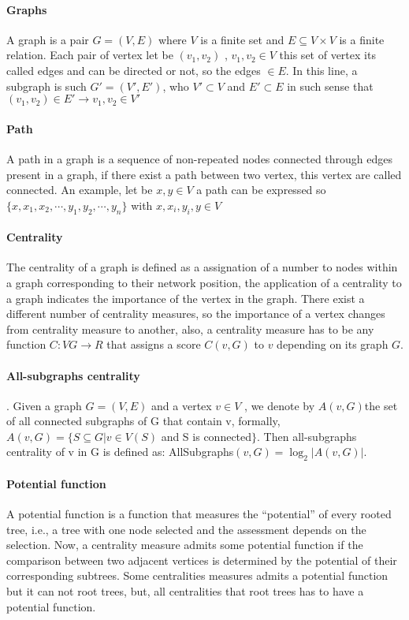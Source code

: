 

\paragraph{Graphs} A graph is a pair $G = (V, E)$ where $V$ is a finite set and $E \subseteq V\times V$ is a finite relation. Each pair of vertex let be $(v_{1},v_{2})$ , $v_{1},v_{2} \in V$ this set of vertex its called edges and can be directed or not, so the edges $\in E$. In this line, a subgraph is such $G'=(V', E')$, who $V' \subset V$ and $E' \subset E$ in such sense that $(v_{1},v_{2}) \in E' \rightarrow v_{1},v_{2} \in V'$

\paragraph{Path} A path in a graph is a sequence of non-repeated nodes connected through edges present in a graph, if there exist a path between two vertex, this vertex are called connected. An example, let be $x,y \in V$ a path can be expressed so $\{x,x_{1},x_{2},\cdots,y_{1},y_{2},\cdots,y_{n} \}$ with $x,x_{i},y_{i},y \in V$


\paragraph{Centrality} The centrality of a graph is defined as a assignation of a number to nodes within a graph corresponding to their network position, the application of a centrality to a graph indicates the importance of the vertex in the graph. There exist a different number of centrality measures, so the importance of a vertex changes from centrality measure to another, also, a centrality measure has to be any function $C : VG \rightarrow R$ that assigns a score $C(v, G)$ to $v$ depending on its graph $G$. 

\paragraph{All-subgraphs centrality} . Given a graph $G = (V, E)$ and a vertex $v \in V$ , we denote by $A(v, G) $the set of all connected subgraphs of G that contain v, formally, $A(v, G) = \{S \subseteq G | v \in V (S)$ and S is connected$\}$. Then all-subgraphs centrality of v in G is defined
as: AllSubgraphs$(v, G) = \log_{2}{|A(v, G)|}$.

\paragraph{Potential function} A potential function is a function that measures the “potential” of every rooted tree, i.e.,
a tree with one node selected and the assessment depends on the selection. Now, a centrality measure admits some potential function if the comparison between two adjacent vertices is determined by the potential of their corresponding subtrees. Some centralities measures admits a potential function but it can not root trees, but, all centralities that root trees has to have a potential function.

